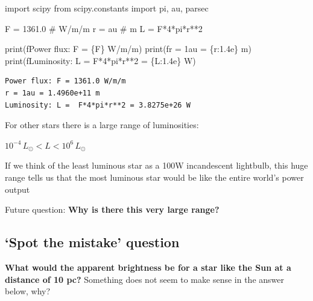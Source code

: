 \documentclass[
  letterpaper,
  DIV=11,
  numbers=noendperiod]{scrreprt}
\newenvironment{Shaded}{\begin{snugshade}}{\end{snugshade}}
\newcommand{\BuiltInTok}[1]{\textcolor[rgb]{0.00,0.23,0.31}{#1}}
\newcommand{\CommentTok}[1]{\textcolor[rgb]{0.37,0.37,0.37}{#1}}
\newcommand{\DecValTok}[1]{\textcolor[rgb]{0.68,0.00,0.00}{#1}}
\newcommand{\FloatTok}[1]{\textcolor[rgb]{0.68,0.00,0.00}{#1}}
\newcommand{\ImportTok}[1]{\textcolor[rgb]{0.00,0.46,0.62}{#1}}
\newcommand{\NormalTok}[1]{\textcolor[rgb]{0.00,0.23,0.31}{#1}}
\newcommand{\OperatorTok}[1]{\textcolor[rgb]{0.37,0.37,0.37}{#1}}
\newcommand{\SpecialCharTok}[1]{\textcolor[rgb]{0.37,0.37,0.37}{#1}}
\newcommand{\SpecialStringTok}[1]{\textcolor[rgb]{0.13,0.47,0.30}{#1}}
\begin{document}
\begin{Shaded}
\begin{Highlighting}[]
\ImportTok{import}\NormalTok{ scipy}
\ImportTok{from}\NormalTok{ scipy.constants }\ImportTok{import}\NormalTok{ pi, au, parsec}

\NormalTok{F }\OperatorTok{=} \FloatTok{1361.0} \CommentTok{\# W/m/m}
\NormalTok{r }\OperatorTok{=}\NormalTok{ au }\CommentTok{\# m}
\NormalTok{L }\OperatorTok{=}\NormalTok{ F}\OperatorTok{*}\DecValTok{4}\OperatorTok{*}\NormalTok{pi}\OperatorTok{*}\NormalTok{r}\OperatorTok{**}\DecValTok{2}

\BuiltInTok{print}\NormalTok{(}\SpecialStringTok{f\textquotesingle{}Power flux: F = }\SpecialCharTok{\{}\NormalTok{F}\SpecialCharTok{\}}\SpecialStringTok{ W/m/m\textquotesingle{}}\NormalTok{)}
\BuiltInTok{print}\NormalTok{(}\SpecialStringTok{f\textquotesingle{}r = 1au = }\SpecialCharTok{\{}\NormalTok{r}\SpecialCharTok{:1.4e\}}\SpecialStringTok{ m\textquotesingle{}}\NormalTok{)}
\BuiltInTok{print}\NormalTok{(}\SpecialStringTok{f\textquotesingle{}Luminosity: L =  F*4*pi*r**2 = }\SpecialCharTok{\{}\NormalTok{L}\SpecialCharTok{:1.4e\}}\SpecialStringTok{ W\textquotesingle{}}\NormalTok{)}
\end{Highlighting}
\end{Shaded}

\begin{verbatim}
Power flux: F = 1361.0 W/m/m
r = 1au = 1.4960e+11 m
Luminosity: L =  F*4*pi*r**2 = 3.8275e+26 W
\end{verbatim}

For other stars there is a large range of luminosities:

\(10^{-4}\,L_\odot < L < 10^{6}\,L_\odot\)

If we think of the least luminous star as a 100W incandescent lightbulb,
this huge range tells us that the most luminous star would be like the
entire world's power output

Future question: \textbf{Why is there this very large range?}

\hypertarget{spot-the-mistake-question-1}{%
\subsection{`Spot the mistake'
question}\label{spot-the-mistake-question-1}}

\textbf{What would the apparent brightness be for a star like the Sun at
a distance of 10 pc?} Something does not seem to make sense in the
answer below, why?
\end{document}
